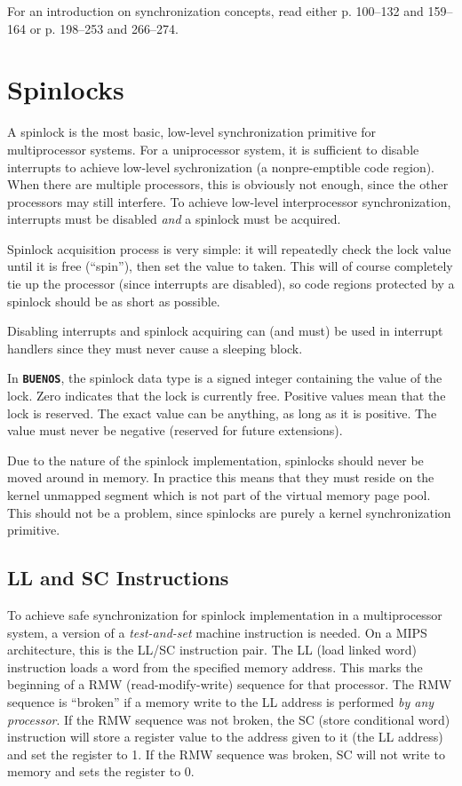 \documentclass[twoside,a4paper]{report}
\newcommand{\buenos}{\texttt{\textbf{BUENOS}}}
\begin{document}
For an introduction on synchronization concepts, read either
\cite{tanenbaum} p. 100--132 and 159--164 or \cite{stallings} p. 198--253
and 266--274.

\section{Spinlocks}
\label{sec:spinlock}

A spinlock is the most basic, low-level synchronization primitive for
multiprocessor systems. For a uniprocessor system, it is sufficient to
disable interrupts to achieve low-level sychronization (a
nonpre-emptible code region). When there are multiple processors, this
is obviously not enough, since the other processors may still
interfere. To achieve low-level interprocessor synchronization,
interrupts must be disabled \emph{and} a spinlock must be acquired.

Spinlock acquisition process is very simple: it will repeatedly check
the lock value until it is free (``spin''), then set the value to
taken. This will of course completely tie up the processor (since
interrupts are disabled), so code regions protected by a spinlock
should be as short as possible.

Disabling interrupts and spinlock acquiring can (and must) be used in
interrupt handlers since they must never cause a sleeping block.

In \buenos{}, the spinlock data type is a signed integer containing
the value of the lock.  Zero indicates that the lock is currently
free. Positive values mean that the lock is reserved. The exact value
can be anything, as long as it is positive. The value must never be
negative (reserved for future extensions).

Due to the nature of the spinlock implementation, spinlocks should
never be moved around in memory. In practice this means that they must
reside on the kernel unmapped segment which is not part of the virtual
memory page pool. This should not be a problem, since spinlocks are
purely a kernel synchronization primitive.

\subsection{LL and SC Instructions}


To achieve safe synchronization for spinlock implementation in a
multiprocessor system, a version of a \emph{test-and-set} machine
instruction is needed. On a MIPS architecture, this is the LL/SC
instruction pair. The LL (load linked word) instruction loads a word
from the specified memory address. This marks the beginning of a RMW
(read-modify-write) sequence for that processor. The RMW sequence is
``broken'' if a memory write to the LL address is performed \emph{by
any processor}. If the RMW sequence was not broken, the SC (store
conditional word) instruction will store a register value to the
address given to it (the LL address) and set the register to 1. If the
RMW sequence was broken, SC will not write to memory and sets the
register to 0.
\end{document}
